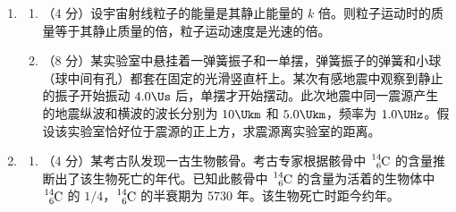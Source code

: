 \documentclass[\gkver]{gaokaozhenti}
\begin{document}
\begin{enumerate}
\item
\begin{enumerate}
	\item
	（4 分）设宇宙射线粒子的能量是其静止能量的 $k$ 倍。则粒子运动时的质量等于其静止质量的倍，粒子运动速度是光速的倍。
	
	\item
	（8 分）某实验室中悬挂着一弹簧振子和一单摆，弹簧振子的弹簧和小球（球中间有孔）都套在固定的光滑竖直杆上。某次有感地震中观察到静止的振子开始振动 $4.0\Us$ 后，单摆才开始摆动。此次地震中同一震源产生的地震纵波和横波的波长分别为 $10\Ukm$ 和 $5.0\Ukm$，频率为 $1.0\UHz$。假设该实验室恰好位于震源的正上方，求震源离实验室的距离。
\end{enumerate}



\item
\begin{enumerate}
	\item
	（4 分）某考古队发现一古生物骸骨。考古专家根据骸骨中 $\ce{^{14}_{6}C}$ 的含量推断出了该生物死亡的年代。已知此骸骨中 $\ce{^{14}_{6}C}$ 的含量为活着的生物体中 $\ce{^{14}_{6}C}$ 的 $1/4$，$\ce{^{14}_{6}C}$ 的半衰期为 5730 年。该生物死亡时距今约年。
	

\end{enumerate}
\end{enumerate}
\end{document}
